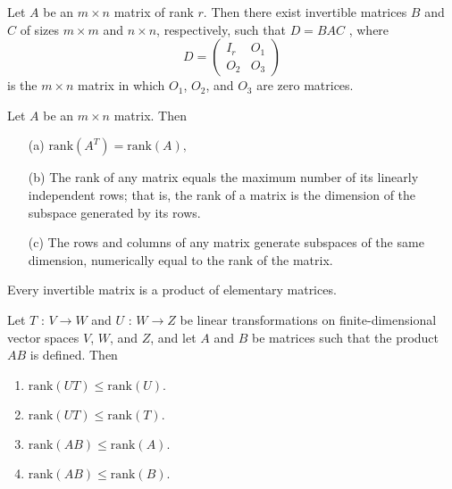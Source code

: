 \begin{corollary}
    Let \( A \) be an \( m \times n \) matrix of rank \( r \). Then there exist invertible matrices \( B \) and \( C \) of sizes \( m \times m \) and \( n \times n \), respectively, such that \( D = BAC \) ,
    where 
    \[
    D  =  \begin{pmatrix}
        I_r & O_1 \\
        O_2 & O_3
    \end{pmatrix}
    \]
    is the \( m \times n \) matrix in which \( O_1 \), \( O_2 \), and \( O_3 \) are zero matrices.
\end{corollary}
\vspace{7cm}

\begin{corollary}
    Let \( A \) be an \( m \times n \) matrix. Then 
    \begin{enumerate}
        \item[(a)] \(\text{rank}(A^T) = \text{rank}(A),\)
        \item[(b)] The rank of any matrix equals the maximum number of its linearly independent rows; that is, the rank of a matrix is the dimension of the subspace generated by its rows.
        \item[(c)] The rows and columns of any matrix generate subspaces of the same dimension, numerically equal to the rank of the matrix.
    \end{enumerate}
\end{corollary}
\vspace{7cm}
\begin{corollary}
    Every invertible matrix is a product of elementary matrices.
\end{corollary}
\vspace{5cm}
\begin{theorem}
    Let \( T \) : \( V \to W \) and \( U \) : \( W \to Z \) be linear transformations on finite-dimensional vector spaces \( V \), \( W \), and \( Z \), and let \( A \) and \( B \) be matrices such that the product \( AB \) is defined. Then
    \begin{enumerate}
        \item \(\text{rank}(UT) \leq \text{rank}(U).\)
        \item \(\text{rank}(UT) \leq \text{rank}(T).\)
        \item \(\text{rank}(AB) \leq \text{rank}(A).\)
        \item \(\text{rank}(AB) \leq \text{rank}(B).\)
    \end{enumerate}
\end{theorem}
\newpage

